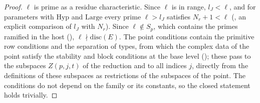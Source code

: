 \begin{proof}
$\ell$ is prime as a residue characteristic. Since $\ell$ is in range, $l_J<\ell$, and for parameters with $\mathrm{Hyp}$ and $\mathrm{Large}$
every prime $\ell>l_J$ satisfies $N_r+1<\ell$ (, an
explicit comparison of $l_J$ with $N_r$). Since $\ell\notin S_p$, which contains the primes ramified in the host
(), $\ell\nmid\mathrm{disc}(E)$. The point conditions contain the primitive row conditions
and the separation of types, from which the complex data of the point satisfy the stability and block conditions at the base level
(); these pass to the subspaces $Z(p,j,t)$ of the
reduction and to all indices $j$, directly from the definitions of these subspaces as restrictions of the subspaces of the
point. The conditions do not depend on the
family or its constants, so the closed statement holds trivially.
\end{proof}

